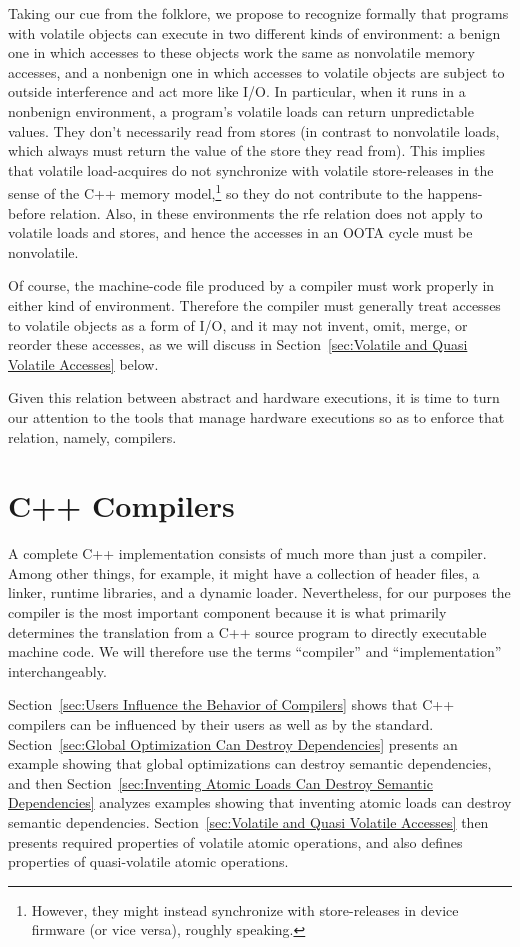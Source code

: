 \documentclass[10]{article}
\begin{document}
Taking our cue from the folklore, we propose to recognize formally
that programs with volatile objects can execute in two different kinds
of environment: a benign one in which accesses to these objects work
the same as nonvolatile memory accesses, and a nonbenign one in which
accesses to volatile objects are subject to outside interference and
act more like I/O.
In particular, when it runs in a nonbenign environment, a program's
volatile loads can return unpredictable values.
They don't necessarily read from stores (in contrast to nonvolatile loads,
which always must return the value of the store they read from).
This implies that volatile load-acquires do not synchronize with
volatile store-releases in the sense of the C++ memory model,\footnote{
	However, they might instead synchronize with store-releases in
	device firmware (or vice versa), roughly speaking.}
so they do not contribute to the happens-before relation.
Also, in these environments the rfe relation does not apply to volatile
loads and stores, and hence the accesses in an OOTA cycle must be nonvolatile.

Of course, the machine-code file produced by a compiler must work
properly in either kind of environment.
Therefore the compiler must generally treat accesses to volatile objects
as a form of I/O, and it may not
invent, omit, merge, or reorder these accesses, as we will discuss in
Section~\ref{sec:Volatile and Quasi Volatile Accesses} below.

Given this relation between abstract and hardware executions, it is time
to turn our attention to the tools that manage hardware executions so as
to enforce that relation, namely, compilers.

\section{C++ Compilers}
\label{sec:C++ Compilers}

A complete C++ implementation consists of much more than just a compiler.
Among other things, for example, it might have a collection of
 header files, a linker, runtime libraries, and a dynamic loader.
Nevertheless, for our purposes the compiler is the most important
component because it is what primarily determines the translation from
a C++ source program to directly executable machine code.
We will therefore use the terms ``compiler'' and ``implementation''
interchangeably.

Section~\ref{sec:Users Influence the Behavior of Compilers}
shows that C++ compilers can be influenced by their users as well
as by the standard.
Section~\ref{sec:Global Optimization Can Destroy Dependencies}
presents an example showing that global optimizations can destroy
semantic dependencies, and then
Section~\ref{sec:Inventing Atomic Loads Can Destroy Semantic Dependencies}
analyzes examples showing that inventing atomic loads can destroy
semantic dependencies.
Section~\ref{sec:Volatile and Quasi Volatile Accesses}
then presents required properties of volatile atomic operations, and
also defines properties of quasi-volatile atomic operations.
\end{document}
